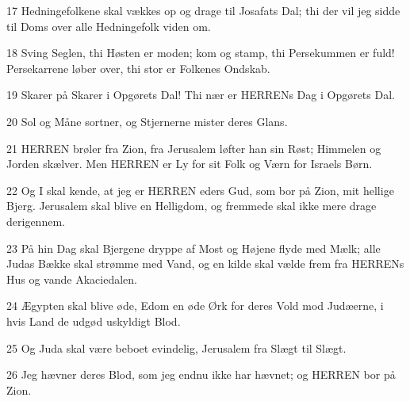 \par 17 Hedningefolkene skal vækkes op og drage til Josafats Dal; thi der vil jeg sidde til Doms over alle Hedningefolk viden om.
\par 18 Sving Seglen, thi Høsten er moden; kom og stamp, thi Persekummen er fuld! Persekarrene løber over, thi stor er Folkenes Ondskab.
\par 19 Skarer på Skarer i Opgørets Dal! Thi nær er HERRENs Dag i Opgørets Dal.
\par 20 Sol og Måne sortner, og Stjernerne mister deres Glans.
\par 21 HERREN brøler fra Zion, fra Jerusalem løfter han sin Røst; Himmelen og Jorden skælver. Men HERREN er Ly for sit Folk og Værn for Israels Børn.
\par 22 Og I skal kende, at jeg er HERREN eders Gud, som bor på Zion, mit hellige Bjerg. Jerusalem skal blive en Helligdom, og fremmede skal ikke mere drage derigennem.
\par 23 På hin Dag skal Bjergene dryppe af Most og Højene flyde med Mælk; alle Judas Bække skal strømme med Vand, og en kilde skal vælde frem fra HERRENs Hus og vande Akaciedalen.
\par 24 Ægypten skal blive øde, Edom en øde Ørk for deres Vold mod Judæerne, i hvis Land de udgød uskyldigt Blod.
\par 25 Og Juda skal være beboet evindelig, Jerusalem fra Slægt til Slægt.
\par 26 Jeg hævner deres Blod, som jeg endnu ikke har hævnet; og HERREN bor på Zion.


